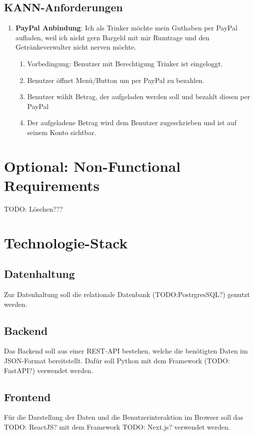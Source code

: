 \documentclass[conference,a4paper]{cs-techrep}
\begin{document}
\subsection{KANN-Anforderungen}

\begin{enumerate}[{USC}1]

\item \textbf{PayPal Anbindung}: Ich als Trinker möchte mein Guthaben per PayPal aufladen, weil ich nicht gern Bargeld mit mir Rumtrage und den Getränkeverwalter nicht nerven möchte.
\begin{enumerate}
	\item Vorbedingung: Benutzer mit Berechtigung Trinker ist eingeloggt.
	\item Benutzer öffnet Menü/Button um per PayPal zu bezahlen.
	\item Benutzer wählt Betrag, der aufgeladen werden soll und bezahlt diesen per PayPal
	\item Der aufgeladene Betrag wird dem Benutzer zugeschrieben und ist auf seinem Konto sichtbar.
\end{enumerate}

\end{enumerate}

\section{Optional: Non-Functional Requirements}
TODO: Löschen???

\section{Technologie-Stack}
\subsection{Datenhaltung}
Zur Datenhaltung soll die relationale Datenbank (TODO:PostrgresSQL?) genutzt werden.
\subsection{Backend}
Das Backend soll aus einer REST-API bestehen, welche die benötigten Daten im JSON-Format bereitstellt. Dafür soll Python mit dem Framework (TODO: FastAPI?) verwendet werden.
\subsection{Frontend}
Für die Darstellung der Daten und die Benutzerinteraktion im Browser soll das TODO: ReactJS? mit dem Framework TODO: Next.js? verwendet werden.
\end{document}
